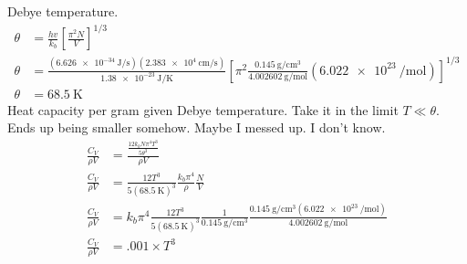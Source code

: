\documentclass{homework}
\begin{document}
\question
Debye temperature.
\begin{align*}
    \theta	&=	\frac{hv}{k_b} \left[\frac{\pi^2 N}{V}\right]^{1/3}	\\
    \theta	&=	\frac{(\SI{6.626e-34}{\joule\per\second})(\SI{2.383e4}{\centi\metre\per\second})}{\SI{1.38e-23}{\joule\per\kelvin}} \left[\pi^2 \frac{\SI{0.145}{\gram\per\centi\metre^3}}{\SI{4.002602}{\gram\per\mole}} (\SI{6.022e23}{\per\mole}) \right]^{1/3}	\\
    \theta  &=  \SI{68.5}{\kelvin}
\end{align*}
Heat capacity per gram given Debye temperature. Take it in the limit $T \ll \theta$. Ends up being smaller somehow. Maybe I messed up. I don't know.
\begin{align*}
    \frac{C_V}{\rho V} &=  \frac{\frac{12 k_b N \pi^4 T^3} {5\theta^3}}{\rho V} \\
    \frac{C_V}{\rho V} &=  \frac{12T^3}{5(\SI{68.5}{\kelvin})^3} \frac{k_b \pi^4}{\rho} \frac{N}{V} \\
    \frac{C_V}{\rho V} &=  k_b \pi^4 \frac{12T^3}{5(\SI{68.5}{\kelvin})^3} \frac{1}{\SI{0.145}{\gram\per\centi\metre^3}} \frac{\SI{0.145}{\gram\per\centi\metre^3} (\SI{6.022e23}{\per\mole})}{\SI{4.002602}{\gram\per\mole}} \\
    \frac{C_V}{\rho V} &=   \boxed{.001 \times T^3}
\end{align*}
\end{document}
